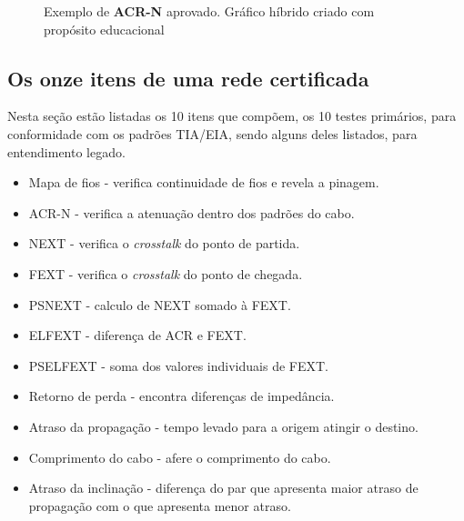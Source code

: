 \documentclass[	DIV=calc,%
							paper=a4,%
							fontsize=12pt,%
							onecolumn]{scrartcl}	 					%
\begin{document}
\begin{figure}[H]
	\noindent{}
	\caption{Exemplo de \textbf{ACR-N} aprovado. Gráfico híbrido criado com propósito educacional \cite{acr}}
	\label{fig5}
\end{figure}


\subsection{Os onze itens de uma rede certificada}
Nesta seção estão listadas os 10 itens que compõem, os 10 testes primários, para conformidade com os padrões TIA/EIA, sendo alguns deles listados, para entendimento legado.

\begin{itemize}
\item Mapa de fios - verifica continuidade de fios e revela a pinagem. 
\item ACR-N - verifica a atenuação dentro dos padrões do cabo.
\item NEXT - verifica o \textit{crosstalk} do ponto de partida.
\item FEXT - verifica o \textit{crosstalk} do ponto de chegada.
\item PSNEXT - calculo de NEXT somado à FEXT.
\item ELFEXT - diferença de ACR e FEXT.
\item PSELFEXT - soma dos valores individuais de FEXT.
\item Retorno de perda - encontra diferenças de impedância.
\item Atraso da propagação - tempo levado para a origem atingir o destino.
\item Comprimento do cabo - afere o comprimento do cabo.
\item Atraso da inclinação - diferença do par que apresenta maior atraso de propagação com o que apresenta menor atraso.
\end{itemize}
\end{document}

